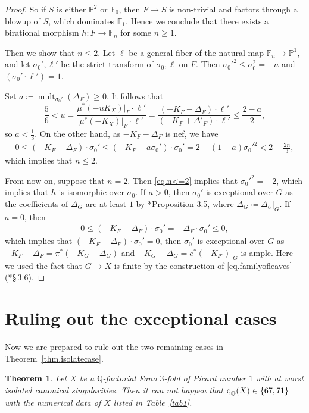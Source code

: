 \documentclass[12pt,twoside]{amsart}
\DeclareMathOperator{\mult}{mult}
\newcommand{\qQ}{\text{\rm q}_{\mathbb{Q}}}
\newtheorem{thm}{Theorem}[section]
\theoremstyle{definition}
\begin{document}
\begin{proof}
    So if $S$ is either $\mathbb{P}^2$ or $\mathbb{F}_0$, then $F\to S$ is non-trivial and factors through a blowup of $S$, which dominates $\mathbb{F}_1$. Hence we conclude that there exists a birational morphism $h\colon F\to \mathbb F_n$ for some $n\geq 1$.

    Then we show that $n\leq 2$. Let $\ell$ be a general fiber of the natural map $ \mathbb{F}_n\to \mathbb{P}^1$, and let $\sigma_0', \ell'$ be the strict transform of $\sigma_0, \ell$ on $F$. Then $\sigma_0'^2\leq \sigma_0^2=-n$ and $(\sigma_0'\cdot \ell')=1$. 
 
    Set $a\coloneq \mult_{\sigma_0'}(\Delta_F)\geq 0$. It follows that 
    \[
        \frac{5}{6}< u=\frac{\mu^*(-uK_X)|_F\cdot \ell'}{\mu^*(-K_X)|_F \cdot \ell'}=\frac{(-K_F-\Delta_F)\cdot \ell'}{(-K_F+\Delta'_F)\cdot \ell'}\leq \frac{2-a}{2},
    \]
    so $a<\frac13$. On the other hand, as $-K_F-\Delta_F$ is nef, we have
    \begin{align}\label{eq.n<=2}
        0\leq (-K_F-\Delta_F)\cdot \sigma_0'\leq (-K_F-a \sigma_0')\cdot \sigma_0' =2+(1-a)\sigma_0'^2< 2-\frac{2n}{3},
    \end{align}
    which implies that $n\leq 2$.

    From now on, suppose that $n=2$. Then \eqref{eq.n<=2} implies that $\sigma_0'^2=-2$, which implies that $h$ is isomorphic over $\sigma_0$. If $a>0$, then $\sigma_0'$ is exceptional over $G$ as the coefficients of $\Delta_G$ are at least $1$ by \cite{jiang-liu-liu}*{Proposition 3.5}, where $\Delta_G\coloneq \Delta_U|_G$. If $a=0$, then 
    \begin{align*}
        0\leq (-K_F-\Delta_F)\cdot \sigma_0'=-\Delta_F\cdot \sigma_0'\leq 0,
    \end{align*}
    which implies that $(-K_F-\Delta_F)\cdot \sigma_0'=0$, then $\sigma_0'$ is exceptional over $G$ as $-K_F-\Delta_F=\pi^*(-K_G-\Delta_G)$ and $-K_G-\Delta_G=e^*(-K_{\mathcal{F}})|_G$ is ample. Here we used the fact that $G\to X$ is finite by the construction of \eqref{eq.familyofleaves} (\cite{druel}*{\S\,3.6}).
\end{proof}


\section{Ruling out the exceptional cases}

Now we are prepared to rule out the two remaining cases in Theorem~\ref{thm.isolatecase}.

\begin{thm}\label{thm.rulingout}
    Let $X$ be a $\mathbb Q$-factorial Fano $3$-fold of Picard number $1$ with at worst isolated canonical singularities. Then it can not happen that $\qQ(X)\in\{67, 71\}$ with the numerical data of $X$ listed in Table~\ref{tab1}.
\end{thm}
\end{document}
